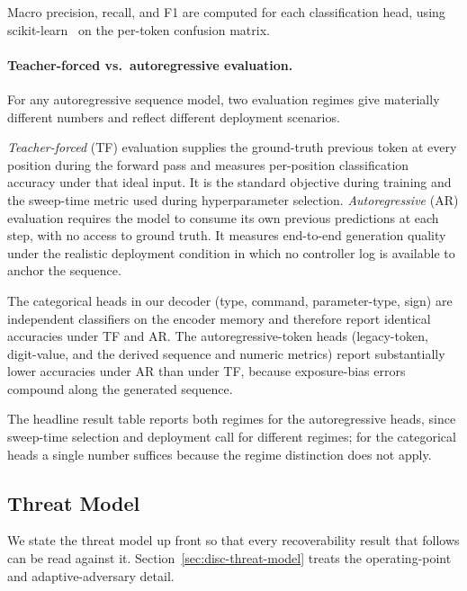 \documentclass[sensors,article,submit,moreauthors,pdftex]{Definitions/mdpi}
\begin{document}
Macro precision, recall, and F1 are computed for each classification head, using scikit-learn~\cite{pedregosa2011sklearn} on the per-token confusion matrix.

\paragraph{Teacher-forced vs.\ autoregressive evaluation.} For any autoregressive sequence model, two evaluation regimes give materially different numbers and reflect different deployment scenarios.

\emph{Teacher-forced} (TF) evaluation supplies the ground-truth previous token at every position during the forward pass and measures per-position classification accuracy under that ideal input. It is the standard objective during training and the sweep-time metric used during hyperparameter selection. \emph{Autoregressive} (AR) evaluation requires the model to consume its own previous predictions at each step, with no access to ground truth. It measures end-to-end generation quality under the realistic deployment condition in which no controller log is available to anchor the sequence.

The categorical heads in our decoder (type, command, parameter-type, sign) are independent classifiers on the encoder memory and therefore report identical accuracies under TF and AR. The autoregressive-token heads (legacy-token, digit-value, and the derived sequence and numeric metrics) report substantially lower accuracies under AR than under TF, because exposure-bias errors compound along the generated sequence.

The headline result table reports both regimes for the autoregressive heads, since sweep-time selection and deployment call for different regimes; for the categorical heads a single number suffices because the regime distinction does not apply.

\subsection{Threat Model}
\label{sec:problem-threat-model}

We state the threat model up front so that every recoverability result that follows can be read against it. Section~\ref{sec:disc-threat-model} treats the operating-point and adaptive-adversary detail.
\end{document}
